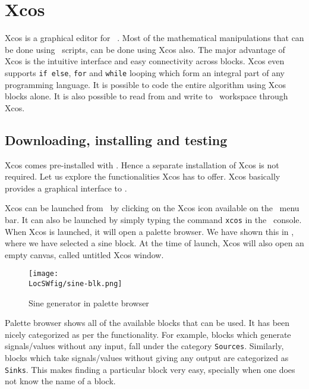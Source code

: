\section{Xcos}
\label{sec:xcos-start}
Xcos is a graphical editor for \scilab\ \cite{xcos-ref}. Most of the
mathematical manipulations that can be done using \scilab\ scripts,
can be done using Xcos also.  The major advantage of Xcos is the
intuitive interface and easy connectivity across blocks. Xcos even
supports {\tt if else}, {\tt for} and {\tt while} looping which form
an integral part of any programming language. It is possible to code
the entire algorithm using Xcos blocks alone. It is also possible to
read from and write to \scilab\ workspace through Xcos.

\subsection{Downloading, installing and testing}
Xcos comes pre-installed with \scilab. Hence a separate installation
of Xcos is not required. Let us explore the functionalities Xcos has
to offer. Xcos basically provides a graphical interface to \scilab.  

Xcos can be launched from \scilab\ by clicking on the Xcos icon
available on the \scilab\ menu bar. It can also be launched by simply
typing the command {\tt xcos} in the \scilab\ console. When Xcos is
launched, it will open a palette browser.  We have shown this in
, where we have selected a sine block.  At the time
of launch, Xcos will also open an empty canvas, called untitled
Xcos window.

\begin{figure}
      \centering
      \texttt{[image: \\LocSWfig/sine-blk.png]}
      \caption{Sine generator in palette browser}
      \label{sine-blk}
\end{figure}




Palette browser shows all of the available blocks that can be used. It
has been nicely categorized as per the functionality. For example,
blocks which generate signals/values without any input, fall under the
category {\tt Sources}. Similarly, blocks which take signals/values
without giving any output are categorized as {\tt Sinks}. This makes
finding a particular block very easy, specially when one does not know
the name of a block.

